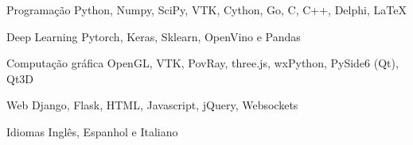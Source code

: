 \begin{cvskills}

  \cvskill
  {Programação} %
  {Python, Numpy, SciPy, VTK, Cython, Go, C, C++, Delphi, LaTeX} %

  \cvskill
  {Deep Learning} %
  {Pytorch, Keras, Sklearn, OpenVino e Pandas} %

  \cvskill
  {Computação gráfica}
  {OpenGL, VTK, PovRay, three.js, wxPython, PySide6 (Qt), Qt3D}

  \cvskill
  {Web} %
  {Django, Flask, HTML, Javascript, jQuery, Websockets} %

  \cvskill
  {Idiomas} %
  {Inglês, Espanhol e Italiano} %

\end{cvskills}
